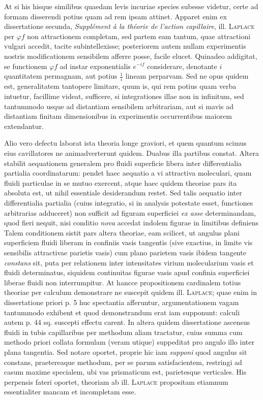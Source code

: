 At si his hisque similibus quaedam levis incuriae species subesse videtur, certe ad formam disserendi potius quam ad rem ipsam attinet. Apparet enim ex dissertatione secunda, \textit{Supplément à la théorie de l’action capillaire}, ill. \textsc{Laplace} per $\varphi f$ non attractionem completam, sed partem eam tantum, quae attractioni vulgari accedit, tacite subintellexisse; posteriorem autem nullam experimentis nostris modificationem sensibilem afferre posse, facile elucet. Quinadeo addigitat, se functionem $\varphi f$ ad instar exponentialis $e^{-if}$ considerare, denotante $i$ quantitatem permagnam, aut potius $\frac{1}{i}$ lineam perparvam. Sed ne opus quidem est, generalitatem tantopere limitare, quum is, qui rem potius quam verba intuetur, facillime videat, sufficere, si integrationes illae non in infinitum, sed tantummodo usque ad distantiam sensibilem arbitrariam, aut si mavis ad distantiam finitam dimensionibus in experimentis occurrentibus maiorem extendantur.

Alio vero defectu laborat ista theoria longe graviori, et quem quantum scimus eius cavillatores ne animadverterunt quidem. Duabus illa partibus constat. Altera stabilit aequationem generalem pro fluidi superficie libera inter differentialia partialia coordinatarum: pendet haec aequatio a vi attractiva moleculari, quam fluidi particulae in se mutuo exercent, atque haec quidem theoriae pars ita absoluta est, ut nihil essentiale desiderandum restet. Sed talis aequatio inter differentialia partialia (cuius integratio, si in analysis potestate esset, functiones arbitrarias adduceret) non sufficit ad figuram superficiei \textit{ex asse} determinandam, quod fieri nequit, nisi conditio \textit{nova} accedat indolem figurae in limitibus definiens Talem conditionem sistit pars altera theoriae, eam scilicet, ut angulus plani superficiem fluidi liberam in confiniis vasis tangentis (sive exactius, in limite vis sensibilis attractivae parietis vasis) cum plano parietem vasis ibidem tangente \textit{constans} sit, puta per relationem inter intensitates virium molecularium vasis et fluidi determinatus, siquidem continuitas figurae vasis apud confinia superficiei liberae fluidi non interrumpitur. At hancce propositionem cardinalem totius theoriae per calculum demonstrare ne suscepit quidem ill. \textsc{Laplace}; quae enim in dissertatione priori p. 5 huc spectantia afferuntur, argumentationem vagam tantummodo exhibent et quod demonstrandum erat iam supponunt: calculi autem p. 44 sq. suscepti effectu carent. In altera quidem dissertatione ascensus fluidi in tubis capillaribus per methodum aliam tractatur, cuius summa cum methodo priori collata formulam (veram utique) suppeditat pro angulo illo inter plana tangentia. Sed notare oportet, proprie hic iam \textit{supponi} quod angulus sit constans, praetereaque methodum, per se parum satisfacientem, restringi ad casum maxime specialem, ubi vas prismaticum est, parietesque verticales. His perpensis fateri oportet, theoriam ab ill. \textsc{Laplace} propositam etiamnum essentialiter mancam et incompletam esse.

